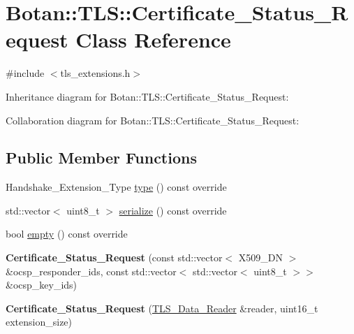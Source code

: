 \hypertarget{class_botan_1_1_t_l_s_1_1_certificate___status___request}{}\section{Botan\+:\+:T\+LS\+:\+:Certificate\+\_\+\+Status\+\_\+\+Request Class Reference}
\label{class_botan_1_1_t_l_s_1_1_certificate___status___request}


{\ttfamily \#include $<$tls\+\_\+extensions.\+h$>$}



Inheritance diagram for Botan\+:\+:T\+LS\+:\+:Certificate\+\_\+\+Status\+\_\+\+Request\+:


Collaboration diagram for Botan\+:\+:T\+LS\+:\+:Certificate\+\_\+\+Status\+\_\+\+Request\+:
\subsection*{Public Member Functions}
\begin{DoxyCompactItemize}
\item 
Handshake\+\_\+\+Extension\+\_\+\+Type \mbox{\hyperlink{class_botan_1_1_t_l_s_1_1_certificate___status___request_a30a98ada0f7b8cfaec9514794a22f54f}{type}} () const override
\item 
std\+::vector$<$ uint8\+\_\+t $>$ \mbox{\hyperlink{class_botan_1_1_t_l_s_1_1_certificate___status___request_a9f468e7f03c565cd88f327924fa9ef7c}{serialize}} () const override
\item 
bool \mbox{\hyperlink{class_botan_1_1_t_l_s_1_1_certificate___status___request_ae4224e1787859f27cbba86a038e1fc78}{empty}} () const override
\item 
\mbox{\label{class_botan_1_1_t_l_s_1_1_certificate___status___request_a509fae0cf078260839287a27e052f20a}} 
{\bfseries Certificate\+\_\+\+Status\+\_\+\+Request} (const std\+::vector$<$ X509\+\_\+\+DN $>$ \&ocsp\+\_\+responder\+\_\+ids, const std\+::vector$<$ std\+::vector$<$ uint8\+\_\+t $>$$>$ \&ocsp\+\_\+key\+\_\+ids)
\item 
\mbox{\label{class_botan_1_1_t_l_s_1_1_certificate___status___request_aa80e742016c92641ec6a3c8a8a126f4d}} 
{\bfseries Certificate\+\_\+\+Status\+\_\+\+Request} (\mbox{\hyperlink{class_botan_1_1_t_l_s_1_1_t_l_s___data___reader}{T\+L\+S\+\_\+\+Data\+\_\+\+Reader}} \&reader, uint16\+\_\+t extension\+\_\+size)
\end{DoxyCompactItemize}
